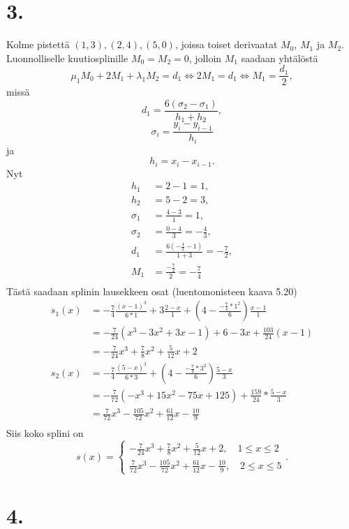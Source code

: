 \documentclass{article}
\begin{document}
\section*{3.}

Kolme pistettä $(1,3),(2,4),(5,0)$, joissa toiset derivaatat $M_0$, $M_1$ ja $M_2$.
Luonnolliselle kuutiosplinille $M_0 = M_2 = 0$, jolloin
$M_1$ saadaan yhtälöstä
\[
  \mu_1M_0 + 2M_1 + \lambda_1M_2 = d_1 \iff 2M_1 = d_1 \iff M_1 = \frac{d_1}{2},
\]
missä
\[
  d_1 = \frac{6(\sigma_2 - \sigma_1)}{h_1 + h_2},
\]
\[
  \sigma_i = \frac{y_i - y_{i-1}}{h_i}
\]
ja
\[
  h_i = x_i - x_{i-1}.
\]
Nyt
\begin{align*}
  h_1 &= 2 - 1 = 1, \\
  h_2 &= 5 - 2 = 3, \\
  \sigma_1 &= \frac{4 - 3}{1} = 1, \\
  \sigma_2 &= \frac{0 - 4}{3} = -\frac{4}{3}, \\
  d_1 &= \frac{6(-\frac{4}{3} - 1)}{1 + 3} = -\frac{7}{2}, \\
  M_1 &= \frac{-\frac{7}{2}}{2} = -\frac{7}{4} \\
\end{align*}
Tästä saadaan splinin lausekkeen osat (luentomonisteen kaava 5.20)
\begin{align*}
  s_1(x) &= -\frac{7}{4}\frac{(x-1)^3}{6*1} + 3\frac{2-x}{1}
      + (4-\frac{-\frac{7}{4}*1^2}{6})\frac{x-1}{1} \\
         &= -\frac{7}{24}(x^3 - 3x^2 + 3x - 1) + 6 - 3x + \frac{103}{24}(x-1) \\
         &= -\frac{7}{24}x^3 + \frac{7}{8}x^2 + \frac{5}{12}x + 2 \\
  s_2(x) &= -\frac{7}{4}\frac{(5-x)^3}{6*3}
    + (4-\frac{-\frac{7}{4}*3^2}{6})\frac{5-x}{3} \\
         &= -\frac{7}{72}(-x^3 + 15x^2 - 75x + 125)
          + \frac{159}{24} * \frac{5-x}{3} \\
         &= \frac{7}{72}x^3 - \frac{105}{72}x^2 + \frac{61}{12}x - \frac{10}{9} \\
\end{align*}
Siis koko splini on
\[
  s(x) =
  \begin{cases}
    -\frac{7}{24}x^3 + \frac{7}{8}x^2 + \frac{5}{12}x + 2, \quad 1 \leq x \leq 2 \\
    \frac{7}{72}x^3 - \frac{105}{72}x^2 + \frac{61}{12}x - \frac{10}{9}, \quad 2 \leq x \leq 5
  \end{cases}.
\]

\section*{4.}
\end{document}
